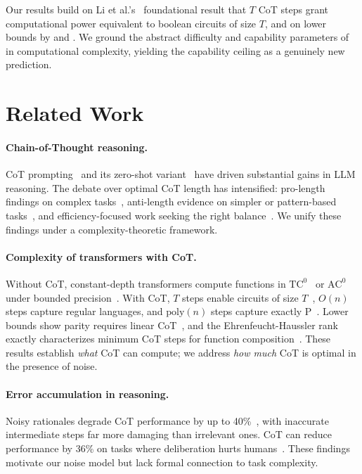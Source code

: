 \documentclass{article}
\theoremstyle{definition}
\theoremstyle{remark}
\providecommand{\TC}{\mathrm{TC}^0}
\providecommand{\poly}{\mathrm{poly}}
\begin{document}
Our results build on Li et al.'s~\cite{li2024chain} foundational result that $T$ CoT steps grant computational power equivalent to boolean circuits of size $T$, and on lower bounds by \citet{amiri2025lower} and \citet{barcelo2025ehrenfeucht}. We ground the abstract difficulty and capability parameters of \citet{wu2025when} in computational complexity, yielding the capability ceiling as a genuinely new prediction.

\section{Related Work}
\label{sec:related}

\paragraph{Chain-of-Thought reasoning.} CoT prompting~\cite{wei2022chain} and its zero-shot variant~\cite{kojima2022large} have driven substantial gains in LLM reasoning. The debate over optimal CoT length has intensified: pro-length findings on complex tasks~\cite{yeo2025demystifying}, anti-length evidence on simpler or pattern-based tasks~\cite{wu2025when,hassid2025overthink,zheng2025curse,liu2025mind}, and efficiency-focused work seeking the right balance~\cite{yang2025thinking,chen2026deep}. We unify these findings under a complexity-theoretic framework.

\paragraph{Complexity of transformers with CoT.} Without CoT, constant-depth transformers compute functions in $\TC$~\cite{merrill2022saturated} or $\mathrm{AC}^0$ under bounded precision~\cite{li2024chain}. With CoT, $T$ steps enable circuits of size $T$~\cite{li2024chain}, $O(n)$ steps capture regular languages, and $\poly(n)$ steps capture exactly $\mathrm{P}$~\cite{merrill2024expressive}. Lower bounds show parity requires linear CoT~\cite{amiri2025lower}, and the Ehrenfeucht-Haussler rank exactly characterizes minimum CoT steps for function composition~\cite{barcelo2025ehrenfeucht}. These results establish \emph{what} CoT can compute; we address \emph{how much} CoT is optimal in the presence of noise.

\paragraph{Error accumulation in reasoning.} Noisy rationales degrade CoT performance by up to 40\%~\cite{zhou2024noisy}, with inaccurate intermediate steps far more damaging than irrelevant ones. CoT can reduce performance by 36\% on tasks where deliberation hurts humans~\cite{liu2025mind}. These findings motivate our noise model but lack formal connection to task complexity.
\end{document}
